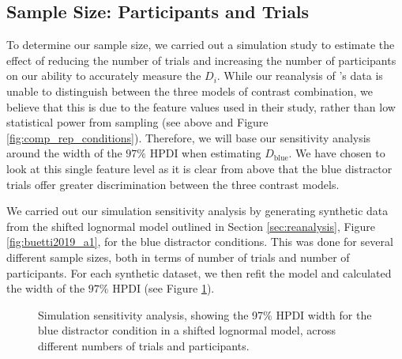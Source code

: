 \documentclass[smallextended, natbib]{svjour3}       %
\begin{document}
\subsection{Sample Size: Participants and Trials}

To determine our sample size, we carried out a simulation study to estimate the effect of reducing the number of trials and increasing the number of participants on our ability to accurately measure the $D_i$. While our reanalysis of \cite{buetti2019predicting}'s data is unable to distinguish between the three models of contrast combination, we believe that this is due to the feature values used in their study, rather than low statistical power from sampling (see above and Figure \ref{fig:comp_rep_conditions}). Therefore, we will base our sensitivity analysis around the width of the $97\%$ HPDI when estimating $D_{\text{blue}}$. We have chosen to look at this single feature level as it is clear from above that the blue distractor trials offer greater discrimination between the three contrast models.

We carried out our simulation sensitivity analysis by generating synthetic data from the shifted lognormal model outlined in Section \ref{sec:reanalysis}, Figure \ref{fig:buetti2019_a1}, for the blue distractor conditions. This was done for several different sample sizes, both in terms of number of trials and number of participants. For each synthetic dataset, we then refit the model and calculated the width of the $97\%$ HPDI (see Figure \ref{fig:power_plot}).

\begin{figure}
\centering
{}
\caption{Simulation sensitivity analysis, showing the 97\% HPDI width for the blue distractor condition in a shifted lognormal model, across different numbers of trials and participants. }
\label{fig:power_plot}
\end{figure}
\end{document}
